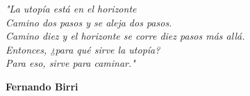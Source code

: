 \begin{dedication}
	\textit{
		"La utopía está en el horizonte\\
		Camino dos pasos y se aleja dos pasos.\\
		Camino diez y el horizonte se corre diez pasos más allá.\\
		Entonces, ¿para qué sirve la utopía?\\
		Para eso, sirve para caminar."\\}
		\begin{flushright}
			\textbf{Fernando Birri}
		\end{flushright}
		\vspace{1cm}
\end{dedication}